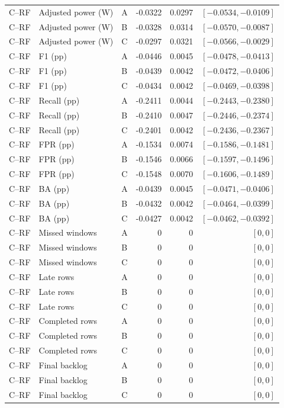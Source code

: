\begin{longtable}{lllrrr}
C--RF & Adjusted power (W) & A & -0.0322 & 0.0297 & $[-0.0534,-0.0109]$\\
C--RF & Adjusted power (W) & B & -0.0328 & 0.0314 & $[-0.0570,-0.0087]$\\
C--RF & Adjusted power (W) & C & -0.0297 & 0.0321 & $[-0.0566,-0.0029]$\\
C--RF & F1 (pp) & A & -0.0446 & 0.0045 & $[-0.0478,-0.0413]$\\
C--RF & F1 (pp) & B & -0.0439 & 0.0042 & $[-0.0472,-0.0406]$\\
C--RF & F1 (pp) & C & -0.0434 & 0.0042 & $[-0.0469,-0.0398]$\\
C--RF & Recall (pp) & A & -0.2411 & 0.0044 & $[-0.2443,-0.2380]$\\
C--RF & Recall (pp) & B & -0.2410 & 0.0047 & $[-0.2446,-0.2374]$\\
C--RF & Recall (pp) & C & -0.2401 & 0.0042 & $[-0.2436,-0.2367]$\\
C--RF & FPR (pp) & A & -0.1534 & 0.0074 & $[-0.1586,-0.1481]$\\
C--RF & FPR (pp) & B & -0.1546 & 0.0066 & $[-0.1597,-0.1496]$\\
C--RF & FPR (pp) & C & -0.1548 & 0.0070 & $[-0.1606,-0.1489]$\\
C--RF & BA (pp) & A & -0.0439 & 0.0045 & $[-0.0471,-0.0406]$\\
C--RF & BA (pp) & B & -0.0432 & 0.0042 & $[-0.0464,-0.0399]$\\
C--RF & BA (pp) & C & -0.0427 & 0.0042 & $[-0.0462,-0.0392]$\\
C--RF & Missed windows & A & 0 & 0 & $[0,0]$\\
C--RF & Missed windows & B & 0 & 0 & $[0,0]$\\
C--RF & Missed windows & C & 0 & 0 & $[0,0]$\\
C--RF & Late rows & A & 0 & 0 & $[0,0]$\\
C--RF & Late rows & B & 0 & 0 & $[0,0]$\\
C--RF & Late rows & C & 0 & 0 & $[0,0]$\\
C--RF & Completed rows & A & 0 & 0 & $[0,0]$\\
C--RF & Completed rows & B & 0 & 0 & $[0,0]$\\
C--RF & Completed rows & C & 0 & 0 & $[0,0]$\\
C--RF & Final backlog & A & 0 & 0 & $[0,0]$\\
C--RF & Final backlog & B & 0 & 0 & $[0,0]$\\
C--RF & Final backlog & C & 0 & 0 & $[0,0]$\\

\end{longtable}
